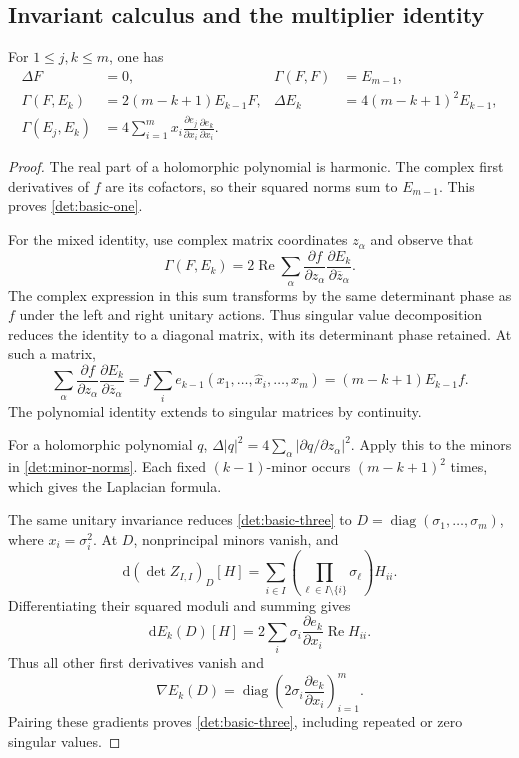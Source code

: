 \subsection{Invariant calculus and the multiplier identity}

\begin{lemma}\label{det:basic-identities}
For $1\leq j,k\leq m$, one has
\begin{align}
 \Delta F&=0,&\Gamma(F,F)&=E_{m-1},\label{det:basic-one}\\
 \Gamma(F,E_k)&=2(m-k+1)E_{k-1}F,
 &\Delta E_k&=4(m-k+1)^2E_{k-1},\label{det:basic-two}\\
 \Gamma(E_j,E_k)
 &=4\sum_{i=1}^m x_i
       \frac{\partial e_j}{\partial x_i}
       \frac{\partial e_k}{\partial x_i}.
 \label{det:basic-three}
\end{align}
\end{lemma}

\begin{proof}
The real part of a holomorphic polynomial is harmonic.  The complex
first derivatives of $f$ are its cofactors, so their squared norms sum
to $E_{m-1}$.  This proves \eqref{det:basic-one}.

For the mixed identity, use complex matrix coordinates $z_\alpha$ and
observe that
\[
 \Gamma(F,E_k)
 =2\operatorname{Re}\sum_\alpha
       \frac{\partial f}{\partial z_\alpha}
       \frac{\partial E_k}{\partial\overline z_\alpha}.
\]
The complex expression in this sum transforms by the same determinant
phase as $f$ under the left and right unitary actions.  Thus singular
value decomposition reduces the identity to a diagonal matrix, with its
determinant phase retained.  At such a matrix,
\[
 \sum_\alpha
       \frac{\partial f}{\partial z_\alpha}
       \frac{\partial E_k}{\partial\overline z_\alpha}
 =f\sum_i e_{k-1}(x_1,\ldots,\widehat x_i,\ldots,x_m)
 =(m-k+1)E_{k-1}f.
\]
The polynomial identity extends to singular matrices by continuity.

For a holomorphic polynomial $q$,
$\Delta|q|^2=4\sum_\alpha|\partial q/\partial z_\alpha|^2$.
Apply this to the minors in \eqref{det:minor-norms}.  Each fixed
$(k-1)$-minor occurs $(m-k+1)^2$ times, which gives the Laplacian
formula.

The same unitary invariance reduces \eqref{det:basic-three} to
$D=\operatorname{diag}(\sigma_1,\ldots,\sigma_m)$, where
$x_i=\sigma_i^2$. At $D$, nonprincipal minors vanish, and
\[
 \mathrm d(\det Z_{I,I})_D[H]
 =\sum_{i\in I}
       \left(\prod_{\ell\in I\setminus\{i\}}\sigma_\ell\right)H_{ii}.
\]
Differentiating their squared moduli and summing gives
\[
 \mathrm dE_k(D)[H]
 =2\sum_i\sigma_i\frac{\partial e_k}{\partial x_i}
                                     \operatorname{Re}H_{ii}.
\]
Thus all other first derivatives vanish and
\[
 \nabla E_k(D)=\operatorname{diag}\left(
             2\sigma_i\frac{\partial e_k}{\partial x_i}\right)_{i=1}^m.
\]
Pairing these gradients proves \eqref{det:basic-three}, including
repeated or zero singular values.
\end{proof}

